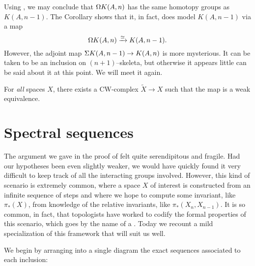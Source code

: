 \begin{remark}\label{ShiftingEMSpaces}
Using , we may conclude that $\Omega K(A, n)$ has the same homotopy groups as $K(A, n-1)$.
The Corollary shows that it, in fact, does model $K(A, n-1)$ via a map \[\Omega K(A, n) \xrightarrow\simeq K(A, n-1).\]
However, the adjoint map $\Sigma K(A, n-1) \to K(A, n)$ is more mysterious.
It can be taken to be an inclusion on $(n+1)$--skeleta, but otherwise it appears little can be said about it at this point.
We will meet it again.
\end{remark}

\begin{remark}
For \emph{all} spaces $X$, there exists a CW-complex $\widetilde X \to X$ such that the map is a weak equivalence.
\end{remark}




\section{Spectral sequences}\label{SpectralSequenceSection}

The argument we gave in the proof of  felt quite serendipitous and fragile.
Had our hypotheses been even slightly weaker, we would have quickly found it very difficult to keep track of all the interacting groups involved.
However, this kind of scenario is extremely common, where a space $X$ of interest is constructed from an infinite sequence of steps
and where we hope to compute some invariant, like $\pi_*(X)$, from knowledge of the relative invariants, like $\pi_*(X_n, X_{n-1})$.
It is so common, in fact, that topologists have worked to codify the formal properties of this scenario, which goes by the name of a .
Today we recount a mild specialization of this framework that will suit us well.

We begin by arranging into a single diagram the exact sequences associated to each inclusion:

